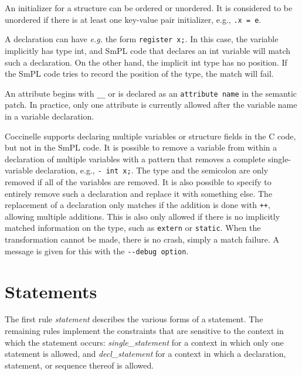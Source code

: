 An initializer for a structure can be ordered or unordered.  It is
considered to be unordered if there is at least one key-value pair
initializer, e.g., \texttt{.x = e}.

A declaration can have \textit{e.g.} the form \texttt{register x;}.  In
this case, the variable implicitly has type int, and SmPL code
that declares an int variable will match such a declaration.  On the other
hand, the implicit int type has no position.  If the SmPL code tries to
record the position of the type, the match will fail.

An attribute begins with {\tt \_\_} or is declared as an {\tt attribute
  name} in the semantic patch.  In practice, only one attribute is
currently allowed after the variable name in a variable declaration.

Coccinelle supports declaring multiple variables or structure fields in the
C code, but not in the SmPL code.  It is possible to remove a variable from
within a declaration of multiple variables with a pattern that removes a
complete single-variable declaration, e.g., {\tt - int x;}.  The type and
the semicolon are only removed if all of the variables are removed.  It is
also possible to specify to entirely remove such a declaration and replace
it with something else.  The replacement of a declaration only matches if
the addition is done with {\tt ++}, allowing multiple additions.  This is
also only allowed if there is no implicitly matched information on the
type, such as {\tt extern} or {\tt static}.  When the transformation cannot
be made, there is no crash, simply a match failure.  A message is given for
this with the {\tt -{}-debug option}.

\section{Statements}

The first rule {\em statement} describes the various forms of a statement.
The remaining rules implement the constraints that are sensitive to the
context in which the statement occurs: {\em single\_statement} for a
context in which only one statement is allowed, and {\em decl\_statement}
for a context in which a declaration, statement, or sequence thereof is
allowed.

